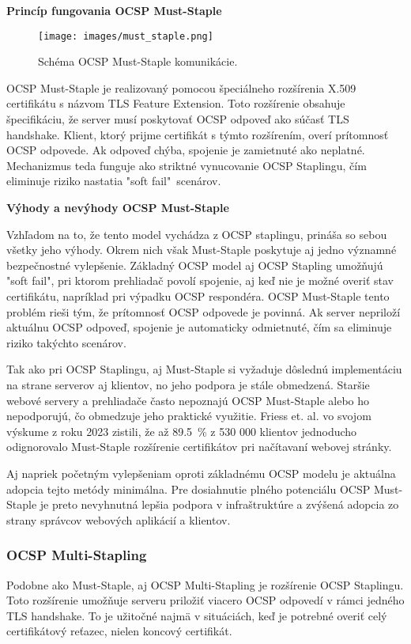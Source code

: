 \documentclass[12pt, twoside]{book}
\newcommand{\subsubsubsection}[1]{%
  \vspace{0.2em}  
  \textbf{#1} \\[0.2em]
  \hspace*{\parindent}
}
\begin{document}
\subsubsubsection{Princíp fungovania OCSP Must-Staple}
\begin{figure}[H]
\centering
\texttt{[image: images/must\_staple.png]}
\caption{Schéma OCSP Must-Staple komunikácie.}
\end{figure}

OCSP Must-Staple je realizovaný pomocou špeciálneho rozšírenia X.509 certifikátu s názvom TLS Feature Extension. Toto rozšírenie obsahuje špecifikáciu, že server musí poskytovať OCSP odpoveď ako súčasť TLS handshake. Klient, ktorý prijme certifikát s týmto rozšírením, overí prítomnosť OCSP odpovede. Ak odpoveď chýba, spojenie je zamietnuté ako neplatné. Mechanizmus teda funguje ako striktné vynucovanie OCSP Staplingu, čím eliminuje riziko nastatia "soft fail"\ scenárov.\cite{must_staple, turin2}

\subsubsubsection{Výhody a nevýhody OCSP Must-Staple}
Vzhľadom na to, že tento model vychádza z OCSP staplingu, prináša so sebou všetky jeho výhody. Okrem nich však Must-Staple poskytuje aj jedno významné bezpečnostné vylepšenie. Základný OCSP model aj OCSP Stapling umožňujú "soft fail", pri ktorom prehliadač povolí spojenie, aj keď nie je možné overiť stav certifikátu, napríklad pri výpadku OCSP respondéra. OCSP Must-Staple tento problém rieši tým, že prítomnosť OCSP odpovede je povinná. Ak server nepriloží aktuálnu OCSP odpoveď, spojenie je automaticky odmietnuté, čím sa eliminuje riziko takýchto scenárov.\cite{must_staple}

Tak ako pri OCSP Staplingu, aj Must-Staple si vyžaduje dôslednú implementáciu na strane serverov aj klientov, no jeho podpora je stále obmedzená. Staršie webové servery a prehliadače často nepoznajú OCSP Must-Staple alebo ho nepodporujú, čo obmedzuje jeho praktické využitie. Friess et. al. vo svojom výskume z roku 2023 zistili, že až 89.5~\% z 530 000 klientov jednoducho odignorovalo Must-Staple rozšírenie certifikátov pri načítavaní webovej stránky.\cite{security_pki}

Aj napriek početným vylepšeniam oproti základnému OCSP modelu je aktuálna adopcia tejto metódy minimálna. Pre dosiahnutie plného potenciálu OCSP Must-Staple je preto nevyhnutná lepšia podpora v infraštruktúre a zvýšená adopcia zo strany správcov webových aplikácií a klientov.


\subsubsection{OCSP Multi-Stapling}
Podobne ako Must-Staple, aj OCSP Multi-Stapling je rozšírenie OCSP Staplingu. Toto rozšírenie umožňuje serveru priložiť viacero OCSP odpovedí v rámci jedného TLS handshake. To je užitočné najmä v situáciách, keď je potrebné overiť celý certifikátový reťazec, nielen koncový certifikát.\cite{turin2}
\end{document}
